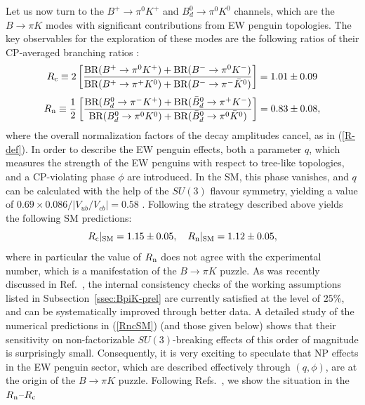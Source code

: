 \documentclass[12pt]{article}
\begin{document}
Let us now turn to the $B^+\to\pi^0K^+$ and $B^0_d\to\pi^0K^0$ channels,
which are the $B\to\pi K$ modes with significant contributions from EW
penguin topologies. The key observables for the exploration of these modes 
are the following ratios of their CP-averaged branching ratios \cite{BF00,BF98}:
\begin{equation}\label{Rc-def}
R_{\rm c}\equiv2\left[\frac{\mbox{BR}(B^+\to\pi^0K^+)+
\mbox{BR}(B^-\to\pi^0K^-)}{\mbox{BR}(B^+\to\pi^+ K^0)+
\mbox{BR}(B^-\to\pi^- \bar K^0)}\right] =%
1.01\pm0.09
\end{equation}
\begin{equation}\label{Rn-def}
R_{\rm n}\equiv\frac{1}{2}\left[
\frac{\mbox{BR}(B_d^0\to\pi^- K^+)+
\mbox{BR}(\bar B_d^0\to\pi^+ K^-)}{\mbox{BR}(B_d^0\to\pi^0K^0)+
\mbox{BR}(\bar B_d^0\to\pi^0\bar K^0)}\right] =%
0.83\pm0.08,
\end{equation}
where the overall normalization factors of the decay amplitudes cancel, 
as in (\ref{R-def}). In order to describe the EW penguin effects, both a parameter 
$q$, which measures the strength of the EW penguins with respect to 
tree-like topologies, and a CP-violating phase $\phi$ are introduced. In the SM, this 
phase vanishes, and $q$ can be calculated with the help of the $SU(3)$ flavour 
symmetry, yielding a value of $0.69 \times 0.086/|V_{ub}/V_{cb}|= 0.58$ \cite{NR}.
Following the strategy described above yields the following SM predictions: 
\begin{equation}\label{RncSM}
R_{\rm c}|_{\rm SM}=1.15 \pm 0.05, \quad R_{\rm n}|_{\rm SM}=1.12 \pm 0.05,
\end{equation}
where in particular the value of $R_{\rm n}$ does not agree with the experimental
number, which is a manifestation of the $B\to\pi K$ puzzle. As was recently
discussed in Ref.~\cite{BFRS-5}, the internal consistency checks of the
working assumptions listed in Subsection~\ref{ssec:BpiK-prel} are
currently satisfied at the level of $25\%$, and can be systematically improved 
through better data. A detailed study of the numerical predictions in 
(\ref{RncSM}) (and those given below) shows that their sensitivity on 
non-factorizable $SU(3)$-breaking effects of this order of magnitude is
surprisingly small. Consequently, it is very exciting to speculate that NP
effects in the EW penguin sector, which are described effectively through
$(q,\phi)$, are at the origin of the $B\to\pi K$ puzzle. 
Following Refs.~\cite{BFRS2,BFRS3}, we show the situation in the 
$R_{\rm n}$--$R_{\rm c}$ 
\end{document}
